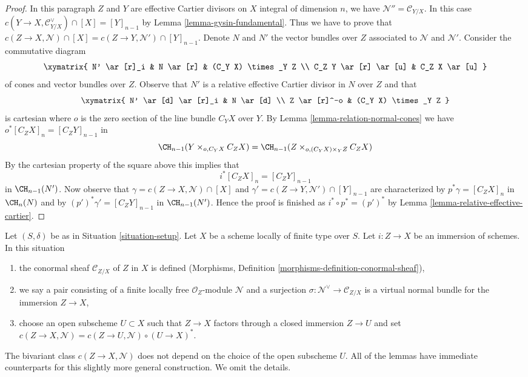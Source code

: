\begin{proof}
\medskip\noindent
In this paragraph $Z$ and $Y$ are effective Cartier divisors on $X$
integral of dimension $n$, we have $\mathcal{N}'' = \mathcal{C}_{Y/X}$.
In this case $c(Y \to X, \mathcal{C}_{Y/X}^\vee) \cap [X] = [Y]_{n - 1}$ by
Lemma \ref{lemma-gysin-fundamental}. Thus we have to prove that
$c(Z \to X, \mathcal{N}) \cap [X] = c(Z \to Y, \mathcal{N}') \cap [Y]_{n - 1}$.
Denote $N$ and $N'$ the vector bundles over $Z$ associated to
$\mathcal{N}$ and $\mathcal{N}'$. Consider the commutative diagram
$$
\xymatrix{
N' \ar[r]_i &
N \ar[r] &
(C_Y X) \times_Y Z \\
C_Z Y \ar[r] \ar[u] &
C_Z X \ar[u]
}
$$
of cones and vector bundles over $Z$. Observe that $N'$ is a relative
effective Cartier divisor in $N$ over $Z$ and that
$$
\xymatrix{
N' \ar[d] \ar[r]_i & N \ar[d] \\
Z \ar[r]^-o & (C_Y X) \times_Y Z
}
$$
is cartesian where $o$ is the zero section of the line bundle
$C_Y X$ over $Y$. By
Lemma \ref{lemma-relation-normal-cones} we have $o^*[C_ZX]_n = [C_Z Y]_{n - 1}$
in
$$
\CH_{n - 1}(Y \times_{o, C_Y X} C_ZX) =
\CH_{n - 1}(Z \times_{o, (C_Y X) \times_Y Z} C_ZX)
$$
By the cartesian property of
the square above this implies that
$$
i^*[C_ZX]_n = [C_Z Y]_{n - 1}
$$
in $\CH_{n - 1}(N')$. Now observe that
$\gamma = c(Z \to X, \mathcal{N}) \cap [X]$ and
$\gamma' = c(Z \to Y, \mathcal{N}') \cap [Y]_{n - 1}$
are characterized by $p^*\gamma = [C_Z X]_n$ in $\CH_n(N)$
and by $(p')^*\gamma' = [C_Z Y]_{n - 1}$ in $\CH_{n - 1}(N')$.
Hence the proof is finished as $i^* \circ p^* = (p')^*$ by
Lemma \ref{lemma-relative-effective-cartier}.
\end{proof}

\begin{remark}
\label{remark-gysin-for-immersion}
Let $(S, \delta)$ be as in Situation \ref{situation-setup}.
Let $X$ be a scheme locally of finite type over $S$.
Let $i : Z \to X$ be an immersion of schemes.
In this situation
\begin{enumerate}
\item the conormal sheaf $\mathcal{C}_{Z/X}$
of $Z$ in $X$ is defined
(Morphisms, Definition \ref{morphisms-definition-conormal-sheaf}),
\item we say a pair consisting of a finite locally free $\mathcal{O}_Z$-module
$\mathcal{N}$ and a surjection $\sigma : \mathcal{N}^\vee \to \mathcal{C}_{Z/X}$
is a virtual normal bundle for the immersion $Z \to X$,
\item choose an open subscheme $U \subset X$ such that $Z \to X$
factors through a closed immersion $Z \to U$ and set
$c(Z \to X, \mathcal{N}) = c(Z \to U, \mathcal{N}) \circ (U \to X)^*$.
\end{enumerate}
The bivariant class $c(Z \to X, \mathcal{N})$ does not depend on the choice
of the open subscheme $U$. All of the lemmas have immediate counterparts
for this slightly more general construction. We omit the details.
\end{remark}







